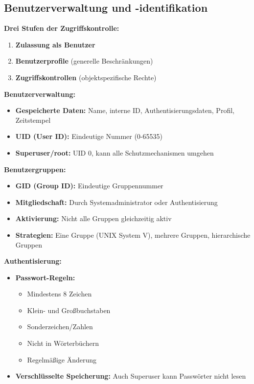 \documentclass[9pt,a4paper]{extarticle}
\begin{document}
\begin{multicols*}{2}
\subsection{Benutzerverwaltung und -identifikation}
\textbf{Drei Stufen der Zugriffskontrolle:}
\begin{enumerate}
\item \textbf{Zulassung als Benutzer}
\item \textbf{Benutzerprofile} (generelle Beschränkungen)
\item \textbf{Zugriffskontrollen} (objektspezifische Rechte)
\end{enumerate}

\textbf{Benutzerverwaltung:}
\begin{itemize}
\item \textbf{Gespeicherte Daten:} Name, interne ID, Authentisierungsdaten, Profil, Zeitstempel
\item \textbf{UID (User ID):} Eindeutige Nummer (0-65535)
\item \textbf{Superuser/root:} UID 0, kann alle Schutzmechanismen umgehen
\end{itemize}

\textbf{Benutzergruppen:}
\begin{itemize}
\item \textbf{GID (Group ID):} Eindeutige Gruppennummer
\item \textbf{Mitgliedschaft:} Durch Systemadministrator oder Authentisierung
\item \textbf{Aktivierung:} Nicht alle Gruppen gleichzeitig aktiv
\item \textbf{Strategien:} Eine Gruppe (UNIX System V), mehrere Gruppen, hierarchische Gruppen
\end{itemize}

\textbf{Authentisierung:}
\begin{itemize}
\item \textbf{Passwort-Regeln:}
  \begin{itemize}
  \item Mindestens 8 Zeichen
  \item Klein- und Großbuchstaben
  \item Sonderzeichen/Zahlen
  \item Nicht in Wörterbüchern
  \item Regelmäßige Änderung
  \end{itemize}
\item \textbf{Verschlüsselte Speicherung:} Auch Superuser kann Passwörter nicht lesen
\end{itemize}


\end{multicols*}
\end{document}
